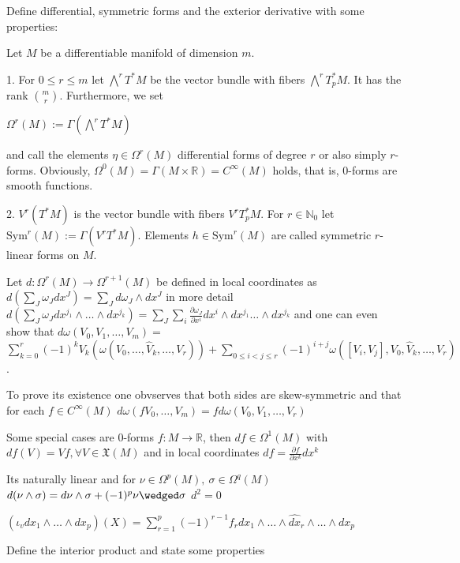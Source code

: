 Define differential, symmetric forms and the exterior derivative with some properties:

Let \(M\) be a differentiable manifold of dimension \(m\).

1. For \(0 \leq r \leq m\) let \(\bigwedge^r T^*M\) be the vector bundle with fibers \(\bigwedge^r T_p^*M\). 
It has the rank \(\binom{m}{r}\). Furthermore, we set 

\(\Omega^r(M) := \Gamma \left( \bigwedge^r T^*M \right)\)

and call the elements \(\eta \in \Omega^r(M)\) differential forms of degree \(r\) or also simply \(r\)-forms. 
Obviously, \(\Omega^0(M) = \Gamma(M \times \mathbb{R}) = C^\infty(M)\) holds, that is, 0-forms are smooth functions.

2. \(V^r(T^*M)\) is the vector bundle with fibers \(V^r T_p^*M\). For \(r \in \mathbb{N}_0\) let
\(\text{Sym}^r(M) := \Gamma \left( V^r T^*M \right).\)
Elements \(h \in \text{Sym}^r(M)\) are called symmetric \(r\)-linear forms on \(M\).

Let  \( d : \Omega^r(M) \to \Omega^{r+1}(M) \) be defined in local coordinates as
\( d( \sum_{J} \omega_J dx^J ) = \sum_{J} d\omega_J \wedge dx^J  \)
in more detail
\( d(\sum_J \omega_J dx^{j_1} \wedge \dots \wedge dx^{j_k}) = \sum_{J} \sum_{i} \frac{\partial \omega_J}{\partial x^i} dx^i \wedge dx^{j_1} \dots \wedge dx^{j_k} \)
and one can even show that
\( d\omega(V_0, V_1, \dots, V_m) =\)
\(\sum_{k=0}^r (-1)^k V_k(\omega(V_0, \dots, \hat{V}_k, \dots, V_r)) + \sum_{0 \leq i < j \leq r} (-1)^{i+j}\omega([V_i, V_j], V_0, \hat{V}_k, \dots, V_r) \).


To prove its existence one obvserves that both sides are skew-symmetric and that for each \( f \in C^\infty(M) \)
\( d\omega(fV_0, \dots, V_m) = fd\omega(V_0, V_1, \dots, V_r) \)

Some special cases are \( 0 \)-forms \( f : M \to \mathbb{R} \), then \( df \in \Omega^1(M) \) with
\( df(V) = Vf, \forall V \in \mathfrak{X}(M) \)
and in local coordinates \( df =  \frac{\partial f}{\partial x^k} dx^k \)

Its naturally linear
and for \( \nu \in \Omega^p(M),\ \sigma \in \Omega^{q}(M)\)
\( d(\nu \wedge \sigma) = d\nu \wedge \sigma + (-1)^p\nu\wedged\sigma \)
\( d^2 = 0 \)


\( (\iota_v dx_1 \wedge \dots \wedge dx_p)(X) = \sum^{p}_{r=1} (-1)^{r-1}f_r dx_1 \wedge \dots \wedge \hat{dx}_r \wedge \dots \wedge dx_p \)

Define the interior product and state some properties

